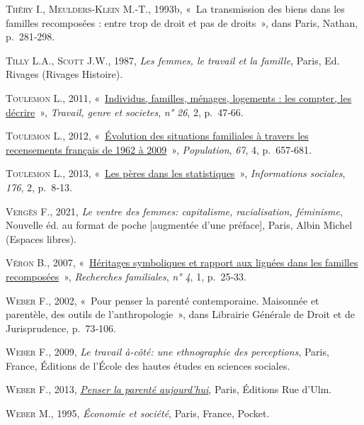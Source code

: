\documentclass[
  12pt,
]{book}
\newlength{\cslhangindent}
\newenvironment{CSLReferences}[2] %
 {\begin{list}{}{%
  \setlength{\itemindent}{0pt}
  \setlength{\leftmargin}{0pt}
  \setlength{\parsep}{0pt}
  \ifodd #1
   \setlength{\leftmargin}{\cslhangindent}
   \setlength{\itemindent}{-1\cslhangindent}
  \fi
  \setlength{\itemsep}{#2\baselineskip}}}
 {\end{list}}
\begin{document}
\begin{CSLReferences}{0}{1}
\textsc{Théry I.}, \textsc{Meulders-Klein M.-T.}, 1993b, {«~La
transmission des biens dans les familles recomposées : entre trop de
droit et pas de droits~»}, dans Paris, Nathan, p.~281‑298.

\textsc{Tilly L.A.}, \textsc{Scott J.W.}, 1987, \emph{Les femmes, le
travail et la famille}, Paris, Ed. Rivages (Rivages Histoire).

\textsc{Toulemon L.}, 2011,
{«~\href{https://www.cairn.info/revue-travail-genre-et-societes-2011-2-page-47.htm}{Individus,
familles, ménages, logements : les compter, les décrire}~»},
\emph{Travail, genre et societes}, \emph{n° 26}, 2, p.~47‑66.

\textsc{Toulemon L.}, 2012,
{«~\href{https://doi.org/10.3917/popu.1204.0657}{Évolution des
situations familiales à travers les recensements français de 1962 à
2009}~»}, \emph{Population}, \emph{67}, 4, p.~657‑681.

\textsc{Toulemon L.}, 2013,
{«~\href{https://doi.org/10.3917/inso.176.0008}{Les pères dans les
statistiques}~»}, \emph{Informations sociales}, \emph{176}, 2, p.~8‑13.

\textsc{Vergès F.}, 2021, \emph{Le ventre des femmes: capitalisme,
racialisation, féminisme}, Nouvelle éd. au format de poche {[}augmentée
d'une préface{]}, Paris, Albin Michel (Espaces libres).

\textsc{Véron B.}, 2007,
{«~\href{http://www.cairn.info/revue-recherches-familiales-2007-1-page-25.htm}{Héritages
symboliques et rapport aux lignées dans les familles recomposées}~»},
\emph{Recherches familiales}, \emph{n° 4}, 1, p.~25‑33.

\textsc{Weber F.}, 2002, {«~Pour penser la parenté contemporaine.
Maisonnée et parentèle, des outils de l{'}anthropologie~»}, dans
Librairie Générale de Droit et de Jurisprudence, p.~73‑106.

\textsc{Weber F.}, 2009, \emph{Le travail à-côté: une ethnographie des
perceptions}, Paris, France, Éditions de l'École des hautes études en
sciences sociales.

\textsc{Weber F.}, 2013,
\emph{\href{http://www.cairn.info/penser-la-parente-aujourd-hui--9782728805013.htm}{Penser
la parenté aujourd'hui}}, Paris, Éditions Rue d'Ulm.

\textsc{Weber M.}, 1995, \emph{Économie et société}, Paris, France,
Pocket.

\end{CSLReferences}
\end{document}
